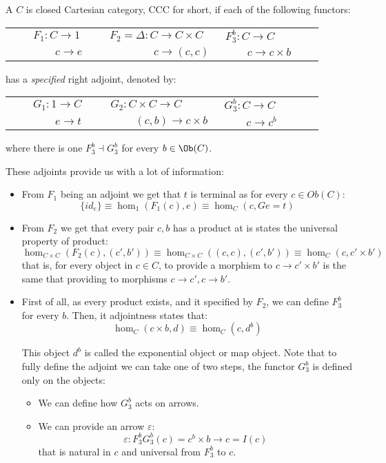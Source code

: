 \begin{definition}\label{def:CCC}
  A $C$ is closed Cartesian category, CCC for short, if each of the following functors:
  \begin{center}
    \begin{tabular}{p{0.3\linewidth}p{0.3\linewidth}p{0.3\linewidth}}
      $\qquad F_1:C\to 1$&$ F_2=\Delta: C \to C\times C $&$ F_{3}^b:C \to C$\\
      $\qquad \qquad c\to e$&$ \qquad \qquad c \to  (c,c)$&$ \qquad c \to c\times b$\\
    \end{tabular}
  \end{center}
  has a \emph{specified} right adjoint, denoted by:
  \begin{center}
    \begin{tabular}{p{0.3\linewidth}p{0.3\linewidth}p{0.3\linewidth}}
      $\qquad G_1:1\to C$&$ G_2:  C\times C\to C $&$ G_{3}^b:C \to C$\\
      $\qquad \qquad e\to t$&$ \  \qquad (c,b)\to c \times b$&$ \qquad c \to c^b$\\
    \end{tabular}
    where there is one $F_3^b\dashv G_3^b$ for every $b\in \Ob(C)$.
  \end{center}

  These adjoints provide us with a lot of information:
  \begin{itemize}
  \item From $F_1$ being an adjoint we get that $t$ is terminal as for every $c\in Ob(C)$:
    $$\{id_e\} \equiv \hom_1(F_1(c), e) \equiv \hom_C(c,Ge=t)   $$
  \item From $F_2$ we get that every pair $c,b$ has a product at is states the universal property of product:
    $$\hom_{C\times C}(F_2(c), (c',b'))\equiv \hom_{C\times C}((c,c), (c',b')) \equiv \hom_C(c,c'\times b')$$
    that is, for every object in $c\in C$, to provide a morphism to $c\to c'\times b'$ is the same that providing to morphisms $c\to c',c\to b'$.
  \item First of all, as every product exists, and it specified by $F_2$, we can define $F_3^b$ for every $b$. Then, it adjointness states that:
    $$\hom_C(c\times b, d) \equiv \hom_C(c,d^b)   $$

    This object $d^b$ is called the exponential object or map object. Note that to fully define the adjoint we can take one of two steps,  the functor $G_3^b$ is defined only on the objects:
    \begin{itemize}
    \item We can define how $G_3^b$ acts on arrows.
    \item We can  provide an arrow $\varepsilon$:
      $$\varepsilon: F_3^bG_3^b(c) = c^b\times b \to c = I(c)$$
      that is natural in $c$ and universal from $F_3^b$ to $c$.
    \end{itemize}


\end{itemize}
\end{definition}

